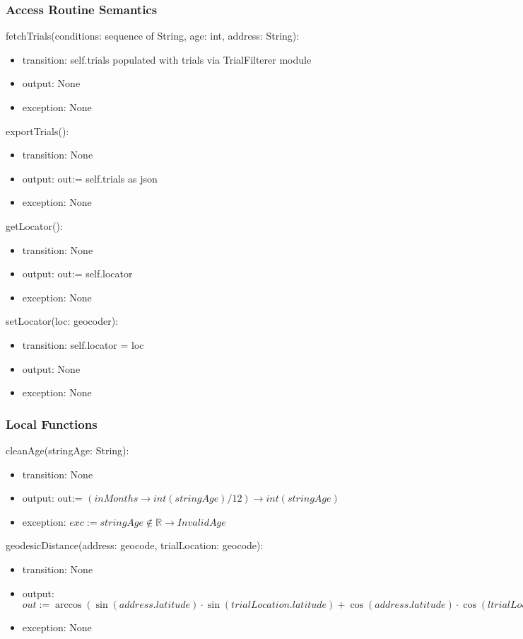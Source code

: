 \documentclass[12pt, titlepage]{article}
\begin{document}
\subsubsection{Access Routine Semantics}

\noindent fetchTrials(conditions: sequence of String, age: int, address: String):
\begin{itemize}
\item transition: self.trials populated with trials via TrialFilterer module
\item output: None
\item exception: None
\end{itemize}

\noindent exportTrials():
\begin{itemize}
\item transition: None
\item output: out:= self.trials as json
\item exception: None
\end{itemize}

\noindent getLocator():
\begin{itemize}
\item transition: None
\item output: out:= self.locator
\item exception: None
\end{itemize}

\noindent setLocator(loc: geocoder):
\begin{itemize}
\item transition: self.locator = loc
\item output: None
\item exception: None
\end{itemize}

\subsubsection{Local Functions}
\noindent cleanAge(stringAge: String):
\begin{itemize}
\item transition: None
\item output: out:= $(inMonths \rightarrow int(stringAge)/12) \rightarrow int(stringAge)$
\item exception:  $exc := stringAge \notin \mathbb{R} \rightarrow InvalidAge$
\end{itemize}

\noindent geodesicDistance(address: geocode, trialLocation: geocode):
\begin{itemize}
\item transition: None
\item output: $out := \arccos(\sin(address.latitude)\cdot\sin(trialLocation.latitude) + \cos(address.latitude)\cdot\cos(ltrialLocation.latitude)\cdot\cos(trialLocation.longitude-address.longitude) ) \cdot 6371000$
\item exception: None
\end{itemize}
\end{document}
